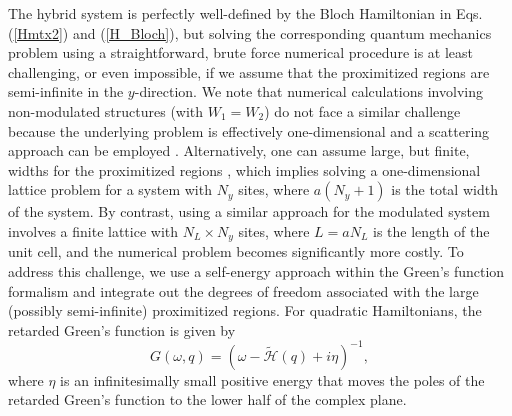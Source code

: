 \documentclass[twocolumn,aps,prb,nofootinbib]{revtex4-2}
\begin{document}
The hybrid system is perfectly well-defined by the Bloch Hamiltonian in Eqs. (\ref{Hmtx2}) and (\ref{H_Bloch}), but solving the corresponding quantum mechanics problem using a straightforward, brute force numerical procedure is at least challenging, or even impossible, if we assume that the proximitized regions are semi-infinite in the $y$-direction. 
We note that numerical calculations involving non-modulated structures (with $W_1=W_2$) do not face a similar challenge because the underlying problem is effectively one-dimensional and a scattering approach can be employed \cite{Pientka2017}. Alternatively, one can assume large, but finite, widths for the proximitized regions \cite{Hell2017a}, which implies solving a one-dimensional lattice problem for a system with $N_y$ sites, where $a (N_y+1)$ is the total width of the system. By contrast, using a similar approach for the modulated system involves a finite lattice with $N_L\times N_y$ sites, where $L = a N_L$ is the length of the unit cell, and the numerical problem becomes significantly more costly. To address this challenge, we use a self-energy approach within the Green's function formalism \cite{Odashima2016,Nolting2018} and integrate out the degrees of freedom associated with the large (possibly semi-infinite) proximitized regions. For quadratic Hamiltonians, the retarded Green's function is given by 
\begin{equation}
    G(\omega,q) = 
    \left(\omega - \widetilde{\mathcal{H}}(q) + i \eta\right)^{-1},
\end{equation}
where $\eta$ is an infinitesimally small positive energy that moves the poles of the retarded Green's function to the lower half of the complex plane. 
\end{document}

